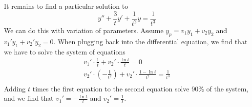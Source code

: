 \documentclass[12pt]{article}
\begin{document}
\begin{enumerate}
          It remains to find a particular solution to
          \[y''+\frac{3}{t}y'+\frac{1}{t^2}y=\frac{1}{t^3}\]
          We can do this with variation of parameters.
          Assume $y_p=v_1y_1+v_2y_2$ and     $v_1'y_1+v_2'y_2=0$.
          When plugging back into the differential equation, we find that we have to solve the system of equations
          \begin{gather*}
              v_1' \cdot \frac{1}{t}+v_2' \cdot \frac{\ln t}{t}=0 \\
              v_2' \cdot \left(-\frac{1}{t^2}\right)+v_2' \cdot \frac{1-\ln t}{t^2}=\frac{1}{t^3} \\
          \end{gather*}
          Adding $t$ times the first equation to the second equation solve 90\% of the system,
          and we find that $v_1'=-\frac{\ln t}{t}$ and $v_2'=\frac{1}{t}$.


\end{enumerate}
\end{document}
